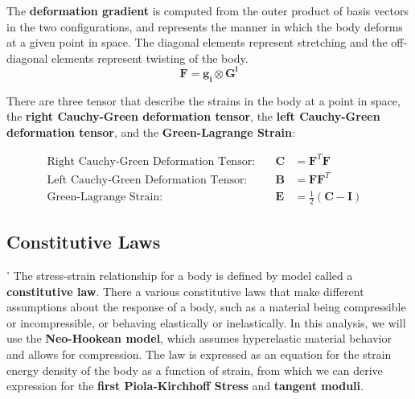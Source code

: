 \documentclass[]{spie}  %
\begin{document}
The \textbf{deformation gradient} is computed from the outer product of basis vectors in the two configurations, and represents the manner in which the body deforms at a given point in space. The diagonal elements represent stretching and the off-diagonal elements represent twisting of the body. 
\begin{equation}
\label{eq: deformation gradient}
\bm{F} = \bm{g_i} \otimes \bm{G^i}
\end{equation}

There are three tensor that describe the strains in the body at a point in space, the \textbf{right Cauchy-Green deformation tensor}, the \textbf{left Cauchy-Green deformation tensor}, and the \textbf{Green-Lagrange Strain}:

\begin{align}
\textrm{Right Cauchy-Green Deformation Tensor:} & \ & \bm{C} 	&= \bm{F}^T\bm{F} & \\
\textrm{Left Cauchy-Green Deformation Tensor:}	& \ & \bm{B}	&= \bm{F}\bm{F}^T & \\
\textrm{Green-Lagrange Strain:}					& \ & \bm{E} 	&= \frac{1}{2}(\bm{C} - \bm{I}) &
\end{align}

\subsection{Constitutive Laws}'
\label{subsec: constitutive laws}
The stress-strain relationship for a body is defined by model called a \textbf{constitutive law}. There a various constitutive laws that make different assumptions about the response of a body, such as a material being compressible or incompressible, or behaving elastically or inelastically. In this analysis, we will use the \textbf{Neo-Hookean model}, which assumes hyperelastic material behavior and allows for compression. The law is expressed as an equation for the strain energy density of the body as a function of strain, from which we can derive expression for the \textbf{first Piola-Kirchhoff Stress} and \textbf{tangent moduli}. 
\end{document}
